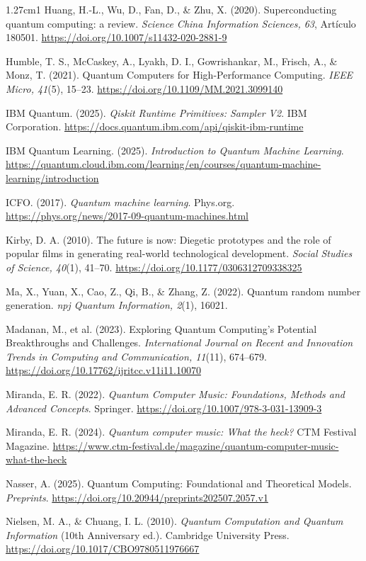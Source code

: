 \documentclass[12pt,a4paper]{article}
\begin{document}
\begin{hangparas}{1.27cm}{1}
Huang, H.-L., Wu, D., Fan, D., \& Zhu, X. (2020). Superconducting quantum computing: a review. \textit{Science China Information Sciences, 63}, Artículo 180501. \url{https://doi.org/10.1007/s11432-020-2881-9}

Humble, T. S., McCaskey, A., Lyakh, D. I., Gowrishankar, M., Frisch, A., \& Monz, T. (2021). Quantum Computers for High-Performance Computing. \textit{IEEE Micro, 41}(5), 15--23. \url{https://doi.org/10.1109/MM.2021.3099140}

IBM Quantum. (2025). \textit{Qiskit Runtime Primitives: Sampler V2}. IBM Corporation. \url{https://docs.quantum.ibm.com/api/qiskit-ibm-runtime}

IBM Quantum Learning. (2025). \textit{Introduction to Quantum Machine Learning}. \url{https://quantum.cloud.ibm.com/learning/en/courses/quantum-machine-learning/introduction}

ICFO. (2017). \textit{Quantum machine learning}. Phys.org. \url{https://phys.org/news/2017-09-quantum-machines.html}

Kirby, D. A. (2010). The future is now: Diegetic prototypes and the role of popular films in generating real-world technological development. \textit{Social Studies of Science, 40}(1), 41--70. \url{https://doi.org/10.1177/0306312709338325}

Ma, X., Yuan, X., Cao, Z., Qi, B., \& Zhang, Z. (2022). Quantum random number generation. \textit{npj Quantum Information, 2}(1), 16021.

Madanan, M., et al. (2023). Exploring Quantum Computing’s Potential Breakthroughs and Challenges. \textit{International Journal on Recent and Innovation Trends in Computing and Communication, 11}(11), 674–679. \url{https://doi.org/10.17762/ijritcc.v11i11.10070}

Miranda, E. R. (2022). \textit{Quantum Computer Music: Foundations, Methods and Advanced Concepts}. Springer. \url{https://doi.org/10.1007/978-3-031-13909-3}

Miranda, E. R. (2024). \textit{Quantum computer music: What the heck?} CTM Festival Magazine. \url{https://www.ctm-festival.de/magazine/quantum-computer-music-what-the-heck}

Nasser, A. (2025). Quantum Computing: Foundational and Theoretical Models. \textit{Preprints}. \url{https://doi.org/10.20944/preprints202507.2057.v1}

Nielsen, M. A., \& Chuang, I. L. (2010). \textit{Quantum Computation and Quantum Information} (10th Anniversary ed.). Cambridge University Press. \url{https://doi.org/10.1017/CBO9780511976667}


\end{hangparas}
\end{document}
